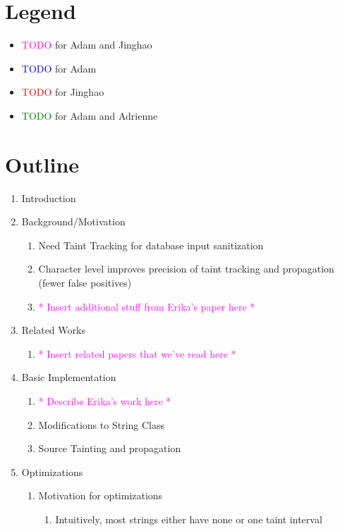 \documentclass[times,11pt]{article}
\begin{document}
\section{Legend}
	\begin{itemize}
	\item \textcolor{magenta}{TODO} for Adam and Jinghao
	\item \textcolor{blue}{TODO} for Adam
	\item \textcolor{red}{TODO} for Jinghao
	\item \textcolor{green}{TODO} for Adam and Adrienne
	\end{itemize}
\section{Outline}
	\begin{enumerate}
	\item Introduction
	\item Background/Motivation
		\begin{enumerate}
		\item Need Taint Tracking for database input sanitization
		\item Character level improves precision of taint tracking and propagation (fewer false positives)
		\item \textcolor{magenta}{* Insert additional stuff from Erika's paper here *}
		\end{enumerate}
	\item Related Works
		\begin{enumerate}
		\item \textcolor{magenta}{* Insert related papers that we've read here *}
		\end{enumerate}
	\item Basic Implementation
		\begin{enumerate}
		\item \textcolor{magenta}{* Describe Erika's work here *}
		\item Modifications to String Class
		\item Source Tainting and propagation
		\end{enumerate}
	\item Optimizations
		\begin{enumerate}
		\item Motivation for optimizations
			\begin{enumerate}
			\item Intuitively, most strings either have none or one taint interval
				\begin{itemize}

\end{itemize}
\end{enumerate}
\end{enumerate}
\end{enumerate}
\end{document}

